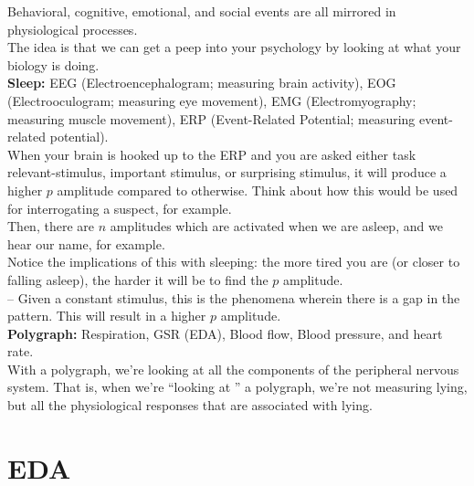  Behavioral, cognitive, emotional, and social events are all mirrored in physiological processes. \\

The idea is that we can get a peep into your psychology by looking at what your biology is doing. \\

\textbf{Sleep:} EEG (Electroencephalogram; measuring brain activity), EOG (Electrooculogram; measuring eye movement), EMG (Electromyography; measuring muscle movement), ERP (Event-Related Potential; measuring event-related potential). \\ 

When your brain is hooked up to the ERP and you are asked either task relevant-stimulus, important stimulus, or surprising stimulus, it will produce a higher \(p\) amplitude compared to otherwise. Think about how this would be used for interrogating a suspect, for example. \\ 

Then, there are \(n\) amplitudes which are activated when we are asleep, and we hear our name, for example. \\

Notice the implications of this with sleeping: the more tired you are (or closer to falling asleep), the harder it will be to find the \(p\) amplitude. \\

 -- Given a constant stimulus, this is the phenomena wherein there is a gap in the pattern. This will result in a higher \(p\) amplitude. \\

\textbf{Polygraph:} Respiration, GSR (EDA), Blood flow, Blood pressure, and heart rate. \\

With a polygraph, we're looking at all the components of the peripheral nervous system. That is, when we're ``looking at  '' a polygraph, we're not measuring lying, but all the physiological responses that are associated with lying. \\



\section{EDA}

